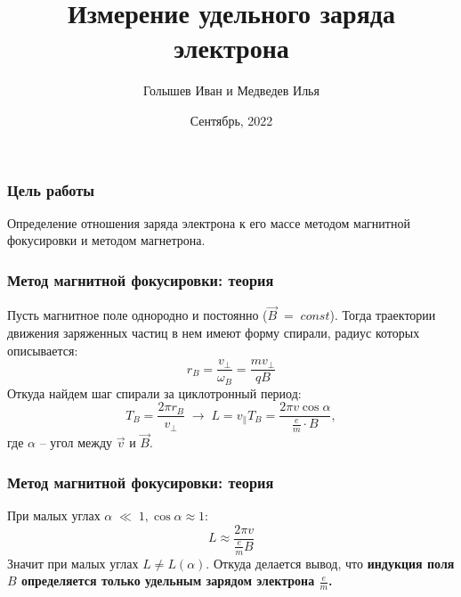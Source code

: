 \documentclass{beamer}
\title[Лабораторная работа №3.3.1]{Измерение удельного заряда электрона}
\author[]{Голышев Иван и Медведев Илья}
\institute[]{Московский физико-технический институт}
\date{Сентябрь, 2022}
\begin{document}

\begin{frame}
\titlepage
\end{frame}



\begin{frame}
\frametitle{Цель работы} 
Определение отношения заряда электрона к его массе методом магнитной фокусировки и методом магнетрона.
\end{frame}


\begin{frame}
\frametitle{Метод магнитной фокусировки: теория}
Пусть магнитное поле однородно и постоянно ($\Vec{B}\;=\;const$). Тогда траектории движения заряженных частиц в нем имеют форму спирали, радиус которых описывается:
\begin{equation}
   r_{B} = \frac{v_{\perp}}{\omega_{B}} = \frac{mv_{\perp}}{qB} 
\end{equation}
Откуда найдем шаг спирали за циклотронный период:
\begin{equation}
    T_{B} = \frac{2\pi r_{B}}{v_{\perp}}\;\longrightarrow\;L = v_{\parallel}T_{B} = \frac{2\pi v \cos{\alpha}}{\frac{e}{m} \cdot B},
\end{equation}
где $\alpha$ -- угол между $\Vec{v}$ и $\Vec{B}$.
\end{frame}


\begin{frame}
\frametitle{Метод магнитной фокусировки: теория}
При малых углах $\alpha\;\ll\;1, \cos{\alpha} \approx 1:$
\begin{equation}
    L \approx \frac{2\pi v}{\frac{e}{m}B}
\end{equation}
Значит при малых углах $L \neq L(\alpha)$. 
Откуда делается вывод, что \textbf{индукция поля $B$ определяется только удельным зарядом электрона $\frac{e}{m}$.}
\end{frame}

\end{document}

